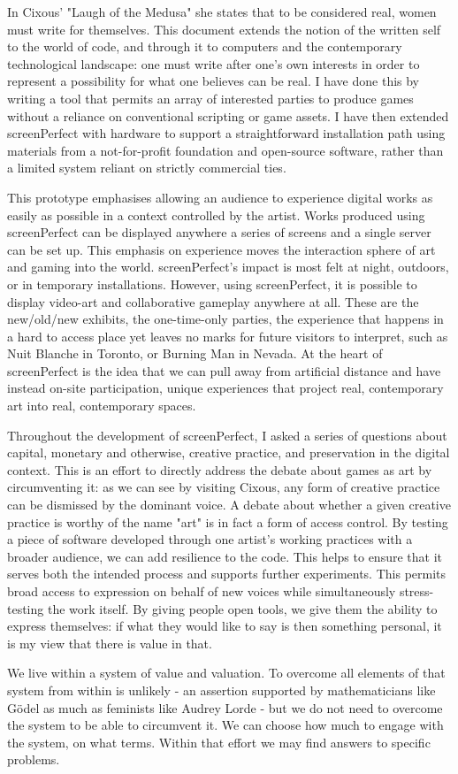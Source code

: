 In Cixous' "Laugh of the Medusa" \parencite{cixous} she states that to be considered real, women must write for themselves. This document extends the notion of the written self to the world of code, and through it to computers and the contemporary technological landscape: one must write after one's own interests in order to represent a possibility for what one believes can be real. I have done this by writing a tool that permits an array of interested parties to produce games without a reliance on conventional scripting or game assets. I have then extended screenPerfect with hardware to support a straightforward installation path using materials from a not-for-profit foundation and open-source software, rather than a limited system reliant on strictly commercial ties.

This prototype emphasises allowing an audience to experience digital works as easily as possible in a context controlled by the artist. Works produced using screenPerfect can be displayed anywhere a series of screens and a single server can be set up. This emphasis on experience moves the interaction sphere of art and gaming into the world. screenPerfect's impact is most felt at night, outdoors, or in temporary installations. However, using screenPerfect, it is possible to display video-art and collaborative gameplay anywhere at all. These are the new/old/new exhibits, the one-time-only parties, the experience that happens in a hard to access place yet leaves no marks for future visitors to interpret, such as Nuit Blanche in Toronto, or Burning Man in Nevada. At the heart of screenPerfect is the idea that we can pull away from artificial distance and have instead on-site participation, unique experiences that project real, contemporary art into real, contemporary spaces.

Throughout the development of screenPerfect, I asked a series of questions about capital, monetary and otherwise, creative practice, and preservation in the digital context. This is an effort to directly address the debate about games as art by circumventing it: as we can see by visiting Cixous, any form of creative practice can be dismissed by the dominant voice. A debate about whether a given creative practice is worthy of the name "art" is in fact a form of access control. By testing a piece of software developed through one artist's working practices with a broader audience, we can add resilience to the code. This helps to ensure that it serves both the intended process and supports further experiments. This permits broad access to expression on behalf of new voices while simultaneously stress-testing the work itself. By giving people open tools, we give them the ability to express themselves: if what they would like to say is then something personal, it is my view that there is value in that.

We live within a system of value and valuation. To overcome all elements of that system from within is unlikely - an assertion supported by mathematicians like Gödel as much as feminists like Audrey Lorde - but we do not need to overcome the system to be able to circumvent it. We can choose how much to engage with the system, on what terms. Within that effort we may find answers to specific problems.
